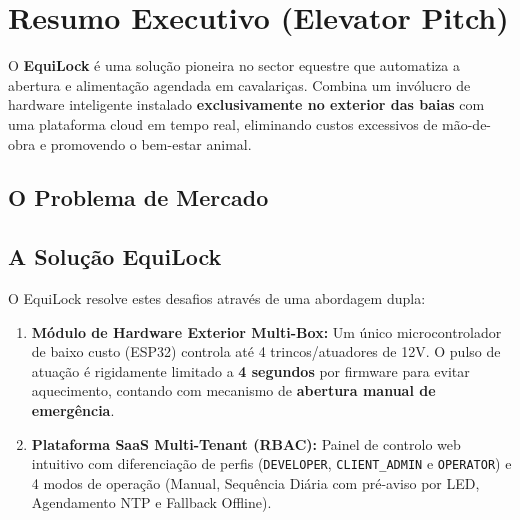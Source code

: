 \documentclass[11pt,a4paper]{article}
\begin{document}
\section{Resumo Executivo (Elevator Pitch)}

\begin{highlightbox}[title=A Oportunidade EquiLock]
O \textbf{EquiLock} é uma solução pioneira no sector equestre que automatiza a abertura e alimentação agendada em cavalariças. Combina um invólucro de hardware inteligente instalado \textbf{exclusivamente no exterior das baias} com uma plataforma cloud em tempo real, eliminando custos excessivos de mão-de-obra e promovendo o bem-estar animal.
\end{highlightbox}

\subsection{O Problema de Mercado}

\subsection{A Solução EquiLock}
O EquiLock resolve estes desafios através de uma abordagem dupla:
\begin{enumerate}
    \item \textbf{Módulo de Hardware Exterior Multi-Box:} Um único microcontrolador de baixo custo (ESP32) controla até 4 trincos/atuadores de 12V. O pulso de atuação é rigidamente limitado a \textbf{4 segundos} por firmware para evitar aquecimento, contando com mecanismo de \textbf{abertura manual de emergência}.
    \item \textbf{Plataforma SaaS Multi-Tenant (RBAC):} Painel de controlo web intuitivo com diferenciação de perfis (\texttt{DEVELOPER}, \texttt{CLIENT\_ADMIN} e \texttt{OPERATOR}) e 4 modos de operação (Manual, Sequência Diária com pré-aviso por LED, Agendamento NTP e Fallback Offline).
\end{enumerate}
\end{document}
